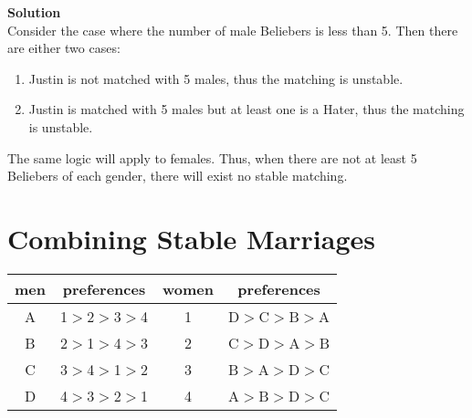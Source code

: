 \documentclass[11pt]{article}
\newcommand*{\Question}[1]{\section{#1}}
\newenvironment{Parts}{\begin{enumerate}[label=(\alph*)]}{\end{enumerate}}
\newenvironment{Answer}{\vspace{10pt}\begin{mdframed}\textbf{Solution}\\}{\end{mdframed}\vfill\pagebreak[3]}
\newenvironment{Answer}{\vspace{10pt}}{\vfill\pagebreak[3]}
\begin{document}
\begin{Parts}
\begin{Answer}
    Consider the case where the number of male Beliebers is less than 5. Then there are either two cases:
    \begin{enumerate}
        \item Justin is not matched with 5 males, thus the matching is unstable.
        \item Justin is matched with 5 males but at least one is a Hater, thus the matching is unstable.
    \end{enumerate}
    The same logic will apply to females. Thus, when there are not at least 5 Beliebers of each gender, there will exist no stable matching.
\end{Answer}

\end{Parts}


\Question{Combining Stable Marriages}

\begin{center}
\begin{tabular}{|c|c||c|c|}\hline
men&preferences& women & preferences \\
\hline
A& 1$>$2$>$3$>$4& 1 & D$>$C$>$B$>$A \\
\hline
B&2$>$1$>$4$>$3 & 2 & C$>$D$>$A$>$B  \\
\hline
C&3$>$4$>$1$>$2 & 3 & B$>$A$>$D$>$C  \\
\hline
D&4$>$3$>$2$>$1 & 4 & A$>$B$>$D$>$C  \\
\hline
\end{tabular}
\end{center}
\end{document}
